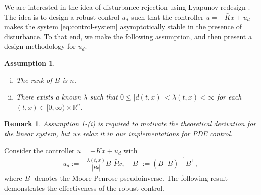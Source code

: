 \documentclass[letterpaper, 10 pt, conference]{ieeeconf}  %
\newtheorem{assumption}{Assumption}
\newtheorem{remark}{Remark}
\newcommand{\tp}{^\top}
\newcommand{\inv}{^{-1}}
\newcommand{\R}{\mathbb{R}}
\newcommand{\ip}[2]{\langle #1, #2 \rangle}
\newcommand{\todo}[1]{{\color{blue} #1}}
\begin{document}
We are interested in the idea of disturbance rejection using Lyapunov redesign \cite[Chapter 14]{khalil}. The idea is to design a robust control $u_d$ such that the controller $u = -\bar{K}x + u_d$ makes the system \eqref{eq:control-system} asymptotically stable in the presence of disturbance. To that end, we make the following assumption, and then present a design methodology for $u_d$. %

\begin{assumption}
\begin{enumerate}[(i)]
    \item The rank of $B$ is $n$. 
    \item There exists a known $\lambda$ such that $0 \le |d(t,x)| < \lambda(t,x) < \infty$ for each $(t,x) \in [0,\infty) \times \R^n$.
\end{enumerate}
\label{assn:B}
\end{assumption}
\begin{remark} 
    Assumption \ref{assn:B}-(i) is required to motivate the theoretical derivation for the linear system, but we relax it in our implementations for PDE control. 
\end{remark}



Consider the controller $u = -\bar{K}x + u_d$ with 
\begin{align*}
    u_d := - \frac{\lambda(t,x)}{| \bar{P}x|} B^{\dagger} \bar{P}x, \quad B^{\dagger} := (B\tp B)\inv B\tp,
\end{align*}
where $B^{\dagger}$ denotes the Moore-Penrose pseudoinverse. 
The following result demonstrates the effectiveness of the robust control.
% 
% 
\end{document}
